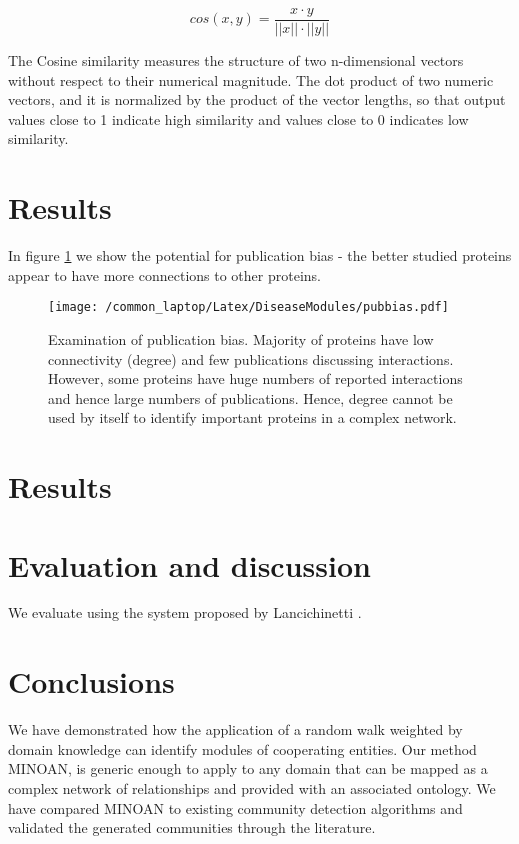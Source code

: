 \documentclass[a4paper,8pt,twocolumn,5p]{elsarticle}
\begin{document}
\begin{equation}\label{closeness}
cos(x,  y) = \frac {x \cdot  y}{|| x|| \cdot || y||}
\end{equation}

The Cosine similarity measures the structure of two n-dimensional vectors without respect to their numerical magnitude. The dot product of two numeric vectors, and it is normalized by the product of the vector lengths, so that output values close to 1 indicate high similarity and values close to 0 indicates low similarity.

\section{Results}
In figure \ref{bias} we show the potential for publication bias - the better studied proteins appear to have more connections to other proteins. 

\begin{figure}[h]
  \begin{center}
 \texttt{[image: /common\_laptop/Latex/DiseaseModules/pubbias.pdf]} 
  \end{center}
 \caption{Examination of publication bias. Majority of proteins have low connectivity (degree) and few publications discussing interactions. However, some proteins have huge numbers of reported interactions and hence large numbers of publications. Hence, degree cannot be used by itself to identify important proteins in a complex network.}
\label{bias}
\end{figure}

\section{Results}

\section{Evaluation and discussion}
We evaluate using the system proposed by Lancichinetti \cite{Lancichinetti2008}.

\section{Conclusions}
We have demonstrated how the application of a random walk weighted by domain knowledge can identify modules of cooperating entities. Our method MINOAN, is generic enough to apply to any domain that can be mapped as a complex network of relationships and provided with an associated ontology. We have compared MINOAN to existing community detection algorithms and validated the generated communities through the literature.
\end{document}
